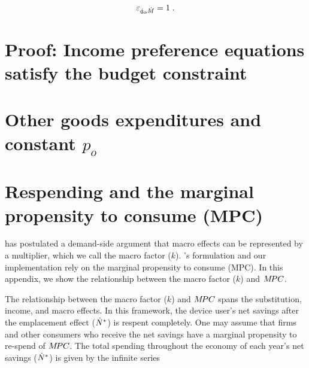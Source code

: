 \documentclass[12pt]{article}\usepackage[]{graphicx}\usepackage[]{xcolor}
\begin{document}
\begin{equation} \label{eq:eqoM}
  \varepsilon_{\dot{q}_o\!,\dot{M}} = 1 \; .
\end{equation}







\section{Proof: Income preference equations satisfy the budget constraint}
\label{sec:proof_income_elasticities}





\section{Other goods expenditures and constant $p_o$}
\label{sec:other_goods_expenditures}




\section{Respending and the
marginal propensity to consume (MPC)}
\label{sec:income_macro_mpc}



\citet{Borenstein:2015aa} has postulated a demand-side argument that macro effects 
can be represented by a multiplier, which we call the macro factor ($k$).
\citeauthor{Borenstein:2015aa}'s formulation and our implementation 
rely on the marginal propensity to consume (MPC).
In this appendix, we show the relationship between the macro factor ($k$) and $M\!PC$.

The relationship between the macro factor ($k$) and $M\!PC$ spans
the substitution, income, and macro effects.
In this framework, the device user's net savings 
after the emplacement effect (${\dot{N}}^*$) is respent completely.
One may assume that firms and other consumers who receive the net savings have a 
marginal propensity to re-spend of $M\!PC$.
The total spending throughout the economy of each year's net savings (${\dot{N}}^*$)
is given by the infinite series
\end{document}
